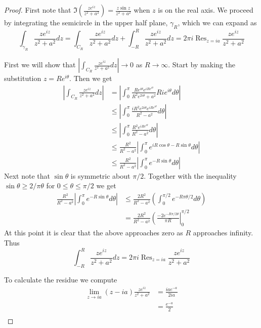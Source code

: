 \documentclass[10pt]{article}
\DeclareMathOperator{\Res}{Res}
\theoremstyle{remark}
\theoremstyle{remark}
\begin{document}
\begin{proof}
  First note that $\Im(\frac{ze^{iz}}{z^2+a^2})=\frac{z\sin z}{z^2+a^2}$ when $z$ is on the real axis. We proceed
  by integrating the semicircle in the upper half plane, $\gamma_R$, which we can
  expand as
  \[
    \int_{\gamma_R}\frac{ze^{iz}}{z^2+a^2}dz=\int_{C_R}\frac{ze^{iz}}{z^2+a^2}dz+\int_{-R}^R\frac{ze^{iz}}{z^2+a^2} dz = 2\pi i\Res_{z=ia}\frac{ze^{iz}}{z^2+a^2}
  \]

  First we will show that $\left|\int_{C_R}\frac{ze^{iz}}{z^2+a^2}dz\right|\rightarrow 0$ as $R\rightarrow\infty$. Start by
  making the substitution $z=Re^{i\theta}$. Then we get
  \begin{align*}
    \left|\int_{C_R}\frac{ze^{iz}}{z^2+a^2}dz\right| &= \left|\int_0^\pi\frac{Re^{i\theta}e^{iRe^{i\theta}}}{R^2e^{2i\theta}+a^2}Rie^{i\theta}d\theta\right|\\
                                                  &\leq \left|\int_0^\pi\frac{iR^2e^{2i\theta}e^{iRe^{i\theta}}}{R^2-a^2}d\theta\right|\\
                                                  &\leq\left|\int_0^\pi\frac{R^2e^{iRe^{i\theta}}}{R^2-a^2}d\theta\right|\\
                                                  &\leq\frac{R^2}{R^2-a^2}\left|\int_0^\pi e^{iR\cos\theta-R\sin\theta}d\theta\right|\\
                                                  &\le\frac{R^2}{R^2-a^2}\left|\int_0^\pi e^{-R\sin\theta}d\theta\right|
  \end{align*}
  Next note that $\sin\theta$ is symmetric about $\pi/2$. Together
  with the inequality $\sin\theta\geq 2/\pi\theta$ for $0\leq\theta\leq\pi/2$ we get
  \begin{align*}
    \frac{R^2}{R^2-a^2}\left|\int_0^\pi e^{-R\sin\theta}d\theta\right| &\leq\frac{2R^2}{R^2-a^2}\left(\int_0^{\pi/2}e^{-R\pi\theta/2}d\theta\right)\\
                                                               &=\frac{2R^2}{R^2-a^2}\left(\frac{-2e^{-R\pi/2\theta}}{\pi R}\right|_0^{\pi/2}
  \end{align*}%
  At this point it is clear that the above approaches zero as $R$ approaches infinity.
  Thus
  \[
    \int_{-R}^R \frac{ze^{iz}}{z^2+a^2}dz = 2\pi i\Res_{z=ia}\frac{ze^{iz}}{z^2+a^2}
  \]

  To calculate the residue we compute
  \begin{align*}
    \lim_{z\rightarrow ia}(z-ia)\frac{ze^{iz}}{z^2+a^2}&=\frac{iae^{-a}}{2ia}\\
                                             &=\frac{e^{-a}}{2}\\
  \end{align*}


\end{proof}
\end{document}
